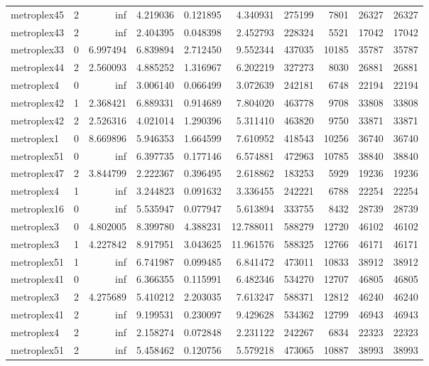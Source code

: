 \begin{longtable}{|l|r|r|r|r|r|r|r|r|r|}
metroplex45 & 2 & inf & 4.219036 & 0.121895 & 4.340931 & 275199 & 7801 & 26327 & 26327 \\
metroplex43 & 2 & inf & 2.404395 & 0.048398 & 2.452793 & 228324 & 5521 & 17042 & 17042 \\
metroplex33 & 0 & 6.997494 & 6.839894 & 2.712450 & 9.552344 & 437035 & 10185 & 35787 & 35787 \\
metroplex44 & 2 & 2.560093 & 4.885252 & 1.316967 & 6.202219 & 327273 & 8030 & 26881 & 26881 \\
metroplex4 & 0 & inf & 3.006140 & 0.066499 & 3.072639 & 242181 & 6748 & 22194 & 22194 \\
metroplex42 & 1 & 2.368421 & 6.889331 & 0.914689 & 7.804020 & 463778 & 9708 & 33808 & 33808 \\
metroplex42 & 2 & 2.526316 & 4.021014 & 1.290396 & 5.311410 & 463820 & 9750 & 33871 & 33871 \\
metroplex1 & 0 & 8.669896 & 5.946353 & 1.664599 & 7.610952 & 418543 & 10256 & 36740 & 36740 \\
metroplex51 & 0 & inf & 6.397735 & 0.177146 & 6.574881 & 472963 & 10785 & 38840 & 38840 \\
metroplex47 & 2 & 3.844799 & 2.222367 & 0.396495 & 2.618862 & 183253 & 5929 & 19236 & 19236 \\
metroplex4 & 1 & inf & 3.244823 & 0.091632 & 3.336455 & 242221 & 6788 & 22254 & 22254 \\
metroplex16 & 0 & inf & 5.535947 & 0.077947 & 5.613894 & 333755 & 8432 & 28739 & 28739 \\
metroplex3 & 0 & 4.802005 & 8.399780 & 4.388231 & 12.788011 & 588279 & 12720 & 46102 & 46102 \\
metroplex3 & 1 & 4.227842 & 8.917951 & 3.043625 & 11.961576 & 588325 & 12766 & 46171 & 46171 \\
metroplex51 & 1 & inf & 6.741987 & 0.099485 & 6.841472 & 473011 & 10833 & 38912 & 38912 \\
metroplex41 & 0 & inf & 6.366355 & 0.115991 & 6.482346 & 534270 & 12707 & 46805 & 46805 \\
metroplex3 & 2 & 4.275689 & 5.410212 & 2.203035 & 7.613247 & 588371 & 12812 & 46240 & 46240 \\
metroplex41 & 2 & inf & 9.199531 & 0.230097 & 9.429628 & 534362 & 12799 & 46943 & 46943 \\
metroplex4 & 2 & inf & 2.158274 & 0.072848 & 2.231122 & 242267 & 6834 & 22323 & 22323 \\
metroplex51 & 2 & inf & 5.458462 & 0.120756 & 5.579218 & 473065 & 10887 & 38993 & 38993 \\

\end{longtable}
